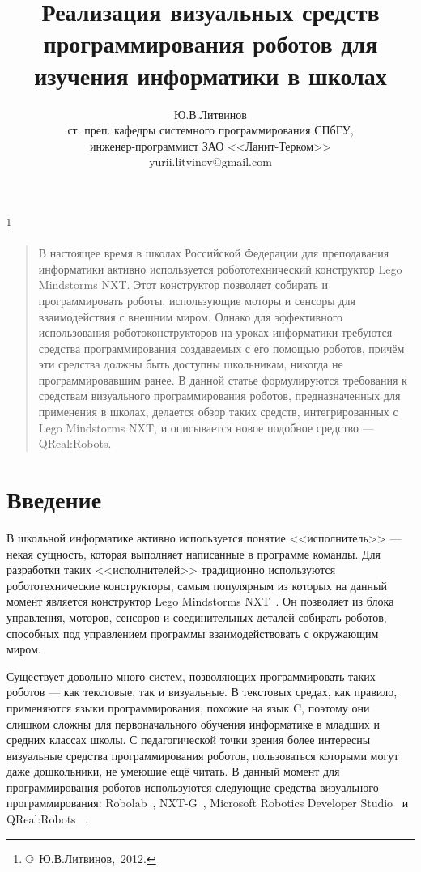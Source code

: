 \documentclass[a4paper]{article}
\title{Реализация визуальных средств программирования роботов для изучения информатики в школах}
\author{Ю.В.Литвинов \\ ст. преп. кафедры системного программирования СПбГУ, \\ инженер-программист ЗАО <<Ланит-Терком>> \\ yurii.litvinov@gmail.com}
\date{}
\begin{document}
\maketitle
\thispagestyle{empty}

\renewcommand{\thefootnote}{}
\footnote{\small{\copyright~Ю.В.Литвинов,~2012.}}
\renewcommand{\thefootnote}{\arabic{footnote}}
\setcounter{footnote}{0}

\begin{quote}
\small\noindent
В настоящее время в школах Российской Федерации для преподавания информатики активно используется робототехнический конструктор Lego Mindstorms NXT. Этот конструктор позволяет собирать и программировать роботы, использующие моторы и сенсоры для взаимодействия с внешним миром. Однако для эффективного использования роботоконструкторов на уроках информатики требуются средства программирования создаваемых с его помощью роботов, причём эти средства должны быть доступны школьникам, никогда не программировавшим ранее. В данной статье формулируются требования к средствам визуального программирования роботов, предназначенных для применения в школах, делается обзор таких средств, интегрированных с  Lego Mindstorms NXT, и описывается новое подобное средство --- QReal:Robots.
\end{quote}

\section*{Введение}
В школьной информатике активно используется понятие <<исполнитель>> --- некая сущность, которая выполняет написанные в программе команды. Для разработки таких <<исполнителей>> традиционно используются робототехнические конструкторы, самым популярным из которых на данный момент является конструктор Lego Mindstorms NXT~\cite{legoNxt}. Он позволяет из блока управления, моторов, сенсоров и соединительных деталей собирать роботов, способных под управлением программы взаимодействовать с окружающим миром.

Существует довольно много систем, позволяющих программировать таких роботов --- как текстовые, так и визуальные. В текстовых средах, как правило, применяются языки программирования, похожие на язык C, поэтому они слишком сложны для первоначального обучения информатике в младших и средних классах школы. С педагогической точки зрения более интересны визуальные средства программирования роботов, пользоваться которыми могут даже дошкольники, не умеющие ещё читать. В данный момент для программирования роботов используются следующие средства визуального программирования: Robolab~\cite{robolab}, NXT-G~\cite{nxtG}, Microsoft Robotics Developer Studio~\cite{mrds} и QReal:Robots~\cite{robots} . 
\end{document}
